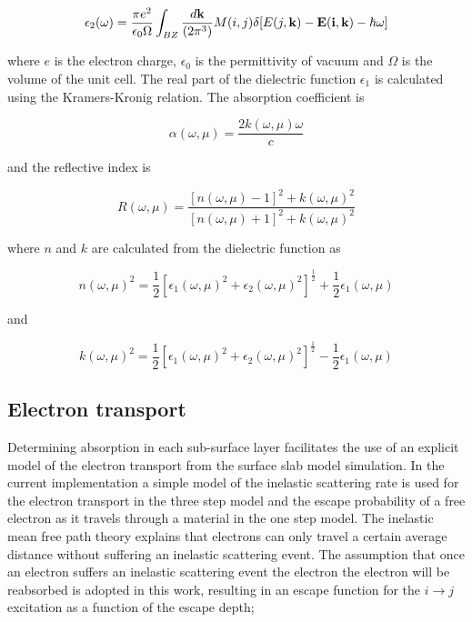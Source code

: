 \documentclass[a4paper,11pt,twoside]{book}
\begin{document}
\begin{equation}
\epsilon_2(\omega) = \frac{\pi e^2}{\epsilon_0 \Omega} \int_{BZ} \frac{d {\bf{k}}}{(2\pi^3)} M(i,j)  \delta[E(j,\bf{k}) -E(i,\bf{k})-\hbar \omega]
    \label{dielectric}
\end{equation}

where $e$ is the electron charge, $\epsilon_0$ is the permittivity of vacuum and $\Omega$ is the volume of the unit cell. The real part of the dielectric function $\epsilon_1$ is calculated using the Kramers-Kronig relation. The absorption coefficient is 

\begin{equation}
\alpha(\omega,\mu) = \frac{2k(\omega, \mu)\omega}{c}
    \label{absorption}
\end{equation}

and the reflective index is

\begin{equation}
R(\omega,\mu) = \frac{[n(\omega, \mu)-1]^2+k(\omega, \mu)^2}{[n(\omega, \mu)+1]^2+k(\omega, \mu)^2}
    \label{reflectivity}
\end{equation}

where $n$ and $k$ are calculated from the dielectric function as

\begin{equation}
n(\omega, \mu)^2 = \frac{1}{2}[\epsilon_1(\omega, \mu)^2 + \epsilon_2(\omega, \mu)^2]^\frac{1}{2}+\frac{1}{2}\epsilon_1(\omega, \mu)
    \label{reflectivity}
\end{equation}

and

\begin{equation}
k(\omega, \mu)^2 = \frac{1}{2}[\epsilon_1(\omega, \mu)^2 + \epsilon_2(\omega, \mu)^2]^\frac{1}{2}-\frac{1}{2}\epsilon_1(\omega, \mu)
    \label{reflectivity}
\end{equation}

\subsection{Electron transport}
Determining absorption in each sub-surface layer facilitates the use of an explicit model of the electron transport from the surface slab model simulation. In the current implementation a simple model of the inelastic scattering rate is used for the electron transport in the three step model and the escape probability of a free electron as it travels through a material in the one step model. The inelastic mean free path theory explains that electrons can only travel a certain average distance without suffering an inelastic scattering event. The assumption that once an electron suffers an inelastic scattering event the electron the electron will be reabsorbed is adopted in this work, resulting in an escape function for the $i \rightarrow j$ excitation as a function of the escape depth;
\end{document}
